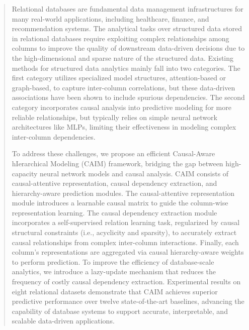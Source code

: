 \documentclass[sigconf, nonacm]{acmart}
\newcommand{\vldb}[1]{{\color{red}#1}}
\begin{document}
\begin{abstract}
\vldb{Relational databases are fundamental data management infrastructures for many real-world applications, including healthcare, finance, and recommendation systems. \vldb{The analytical tasks over structured data stored in relational databases require exploiting complex relationships among columns to improve the quality of downstream data-driven decisions} due to the high-dimensional and sparse nature of the structured data. Existing methods for structured data analytics mainly fall into two categories. The first category utilizes specialized model structures, attention-based or graph-based, to capture inter-column correlations, but these data-driven associations have been shown to include \vldb{spurious dependencies}. The second category incorporates causal analysis into predictive modeling for more reliable relationships, but \vldb{typically} relies on simple \vldb{neural network} architectures like MLPs, limiting their effectiveness in \vldb{modeling complex inter-column dependencies}.

To address these \vldb{challenges}, we propose an efficient Causal-Aware \vldb{hIerarchical} Modeling (CAIM) framework, bridging the gap between high-capacity neural network models and causal analysis. CAIM consists of causal-attentive representation, causal dependency extraction, and hierarchy-aware prediction modules. The causal-attentive representation module \vldb{introduces} a learnable causal matrix to guide the column-wise representation learning. The causal dependency extraction module incorporates a self-supervised relation learning task, regularized by causal structural constraints (i.e., acyclicity and sparsity), to accurately extract causal relationships from complex inter-column interactions. Finally, each column’s representations are aggregated via causal hierarchy-aware weights to perform prediction. \vldb{To improve the efficiency of database-scale analytics, we introduce a lazy-update mechanism that reduces the frequency of costly causal dependency extraction.} Experimental results on eight \vldb{relational} datasets demonstrate that CAIM achieves superior predictive performance \vldb{over} twelve state-of-the-art baselines, \vldb{advancing the capability of database systems to support accurate, interpretable, and scalable data-driven applications.}}
\end{abstract}

\maketitle
\end{document}
